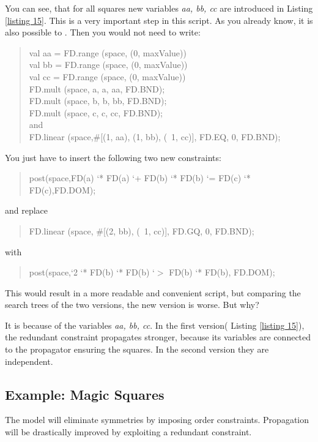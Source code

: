 \documentclass[a4paper,halfparskip]{scrartcl}
\begin{document}
You can see, that for all squares new variables \emph{aa, bb, cc}
are introduced in Listing \ref{listing 15}. This is a very important
step in this script. As you already know, it is also possible to
. Then you would not need to write:
\begin{quote}
 val aa = FD.range (space, (0, maxValue))\\
 val bb = FD.range (space, (0, maxValue))\\
 val cc = FD.range (space, (0, maxValue))\\
 FD.mult (space, a, a, aa, FD.BND);\\
 FD.mult (space, b, b, bb, FD.BND);\\
 FD.mult (space, c, c, cc, FD.BND);\\
and\\
 FD.linear (space,$ \#$[(1, aa), (1, bb), (~1, cc)], FD.EQ, 0, FD.BND);
\end{quote}
You just have to insert the following two new constraints:
\begin{quote}
 post(space,FD(a) `* FD(a) `+ FD(b) `* FD(b) `= FD(c) `* FD(c),FD.DOM);
\end{quote}
and replace
\begin{quote}
 FD.linear (space, $\#$[(2, bb), (~1, cc)], FD.GQ, 0, FD.BND);
\end{quote}
with
\begin{quote}
post(space,`2 `* FD(b) `* FD(b) `$>$ FD(b) `* FD(b), FD.DOM);
\end{quote}

This would result in a more readable and convenient script, but
comparing the search trees of the two versions, the new version
is worse. But why?

It is because of the variables \emph{aa, bb, cc}. In the first
version( Listing \ref{listing 15}), the redundant constraint
propagates stronger, because its variables are connected to
the propagator ensuring the squares. In the second version they
are independent. 


\newpage
\subsection{Example: Magic Squares}

The model will eliminate symmetries by imposing order 
constraints. Propagation will be drastically improved by 
exploiting a redundant constraint. 
\end{document}
